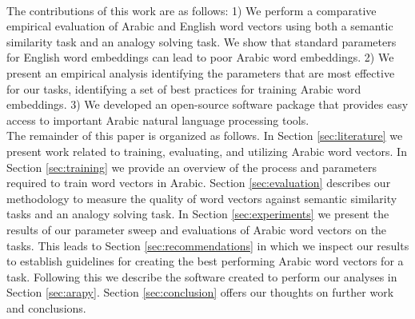 \\
The contributions of this work are as follows: 1) We perform a comparative empirical evaluation of Arabic and English word vectors using both a semantic similarity task and an analogy solving task. We show that standard parameters for English word embeddings can lead to poor Arabic word embeddings. 2) We present an empirical analysis identifying the parameters that are most effective for our tasks, identifying a set of best practices for training Arabic word embeddings. 3) We developed an open-source software package that provides easy access to important Arabic natural language processing tools. 
\\
The remainder of this paper is organized as follows. In Section \ref{sec:literature} we present work related to training, evaluating, and utilizing Arabic word vectors. In Section \ref{sec:training} we provide an overview of the process and parameters required to train word vectors in Arabic. Section \ref{sec:evaluation} describes our methodology to measure the quality of word vectors against semantic similarity tasks and an analogy solving task. In Section \ref{sec:experiments} we present the results of our parameter sweep and evaluations of Arabic word vectors on the tasks. This leads to Section \ref{sec:recommendations} in which we inspect our results to establish guidelines for creating the best performing Arabic word vectors for a task. Following this we describe the software created to perform our analyses in Section \ref{sec:arapy}. Section \ref{sec:conclusion} offers our thoughts on further work and conclusions.
